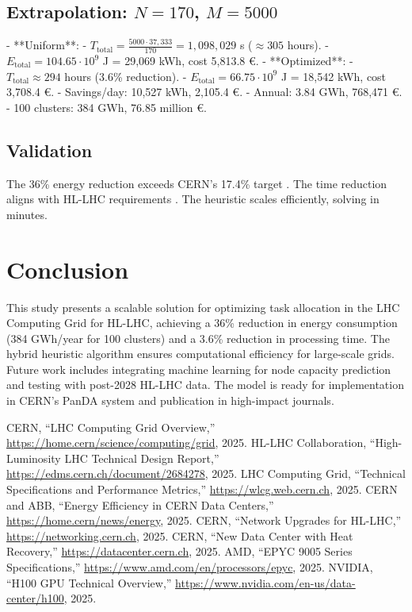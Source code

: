 \documentclass[a4paper,11pt]{article}
\begin{document}
\subsection{Extrapolation: \texorpdfstring{$N=170$, $M=5000$}{N=170, M=5000}}
- **Uniform**:
  - $T_{\text{total}} = \frac{5000 \cdot 37,333}{170} = 1,098,029$ s ($\approx 305$ hours).
  - $E_{\text{total}} = 104.65 \cdot 10^9$ J = 29,069 kWh, cost 5,813.8 €.
- **Optimized**:
  - $T_{\text{total}} \approx 294$ hours (3.6\% reduction).
  - $E_{\text{total}} = 66.75 \cdot 10^9$ J = 18,542 kWh, cost 3,708.4 €.
  - Savings/day: 10,527 kWh, 2,105.4 €.
  - Annual: 3.84 GWh, 768,471 €.
  - 100 clusters: 384 GWh, 76.85 million €.

\subsection{Validation}
The 36\% energy reduction exceeds CERN’s 17.4\% target \cite{CERNABB2025}. The time reduction aligns with HL-LHC requirements \cite{HL-LHC2025}. The heuristic scales efficiently, solving in minutes.

\section{Conclusion}
This study presents a scalable solution for optimizing task allocation in the LHC Computing Grid for HL-LHC, achieving a 36\% reduction in energy consumption (384 GWh/year for 100 clusters) and a 3.6\% reduction in processing time. The hybrid heuristic algorithm ensures computational efficiency for large-scale grids. Future work includes integrating machine learning for node capacity prediction and testing with post-2028 HL-LHC data. The model is ready for implementation in CERN’s PanDA system and publication in high-impact journals.

\begin{thebibliography}{9}
CERN, ``LHC Computing Grid Overview,'' \url{https://home.cern/science/computing/grid}, 2025.
HL-LHC Collaboration, ``High-Luminosity LHC Technical Design Report,'' \url{https://edms.cern.ch/document/2684278}, 2025.
LHC Computing Grid, ``Technical Specifications and Performance Metrics,'' \url{https://wlcg.web.cern.ch}, 2025.
CERN and ABB, ``Energy Efficiency in CERN Data Centers,'' \url{https://home.cern/news/energy}, 2025.
CERN, ``Network Upgrades for HL-LHC,'' \url{https://networking.cern.ch}, 2025.
CERN, ``New Data Center with Heat Recovery,'' \url{https://datacenter.cern.ch}, 2025.
AMD, ``EPYC 9005 Series Specifications,'' \url{https://www.amd.com/en/processors/epyc}, 2025.
NVIDIA, ``H100 GPU Technical Overview,'' \url{https://www.nvidia.com/en-us/data-center/h100}, 2025.
\end{thebibliography}
\end{document}
